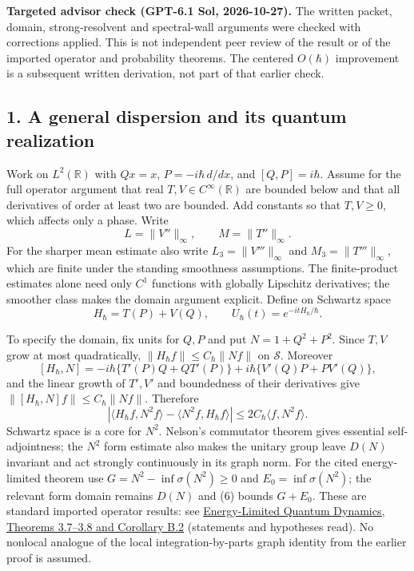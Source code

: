 \documentclass[11pt,a4paper]{article}
\begin{document}
\textbf{Targeted advisor check (GPT-6.1 Sol, 2026-10-27).} The written
packet, domain, strong-resolvent and spectral-wall arguments were
checked with corrections applied. This is not independent peer review of
the result or of the imported operator and probability theorems. The
centered \(O(\hbar)\) improvement is a subsequent written derivation,
not part of that earlier check.

\hypertarget{a-general-dispersion-and-its-quantum-realization}{%
\subsection{1. A general dispersion and its quantum
realization}\label{a-general-dispersion-and-its-quantum-realization}}

Work on \(L^2(\mathbb R)\) with \(Qx=x\), \(P=-i\hbar\,d/dx\), and
\([Q,P]=i\hbar\). Assume for the full operator argument that real
\(T,V\in C^\infty(\mathbb R)\) are bounded below and that all
derivatives of order at least two are bounded. Add constants so that
\(T,V\ge0\), which affects only a phase. Write
\[L=\|V''\|_\infty,\qquad M=\|T''\|_\infty.\tag{3}\] For the sharper
mean estimate also write \(L_3=\|V'''\|_\infty\) and
\(M_3=\|T'''\|_\infty\), which are finite under the standing smoothness
assumptions. The finite-product estimates alone need only \(C^1\)
functions with globally Lipschitz derivatives; the smoother class makes
the domain argument explicit. Define on Schwartz space
\[H_\hbar=T(P)+V(Q),\qquad U_\hbar(t)=e^{-itH_\hbar/\hbar}.\tag{4}\]

To specify the domain, fix units for \(Q,P\) and put \(N=1+Q^2+P^2\).
Since \(T,V\) grow at most quadratically,
\(\|H_\hbar f\|\le C_\hbar\|Nf\|\) on \(\mathcal S\). Moreover \[
 [H_\hbar,N]
 =-i\hbar\{T'(P)Q+QT'(P)\}
  +i\hbar\{V'(Q)P+PV'(Q)\},\tag{5}
\] and the linear growth of \(T',V'\) and boundedness of their
derivatives give \(\|[H_\hbar,N]f\|\le C_\hbar\|Nf\|\). Therefore \[
 |\langle H_\hbar f,N^2f\rangle
      -\langle N^2f,H_\hbar f\rangle|
 \le2C_\hbar\langle f,N^2f\rangle.\tag{6}
\] Schwartz space is a core for \(N^2\). Nelson's commutator theorem
gives essential self-adjointness; the \(N^2\) form estimate also makes
the unitary group leave \(D(N)\) invariant and act strongly continuously
in its graph norm. For the cited energy-limited theorem use
\(G=N^2-\inf\sigma(N^2)\ge0\) and \(E_0=\inf\sigma(N^2)\); the relevant
form domain remains \(D(N)\) and (6) bounds \(G+E_0\). These are
standard imported operator results: see
\href{https://link.springer.com/article/10.1007/s00220-025-05282-w}{Energy-Limited
Quantum Dynamics, Theorems 3.7--3.8 and Corollary B.2} (statements and
hypotheses read). No nonlocal analogue of the local integration-by-parts
graph identity from the earlier proof is assumed.
\end{document}
